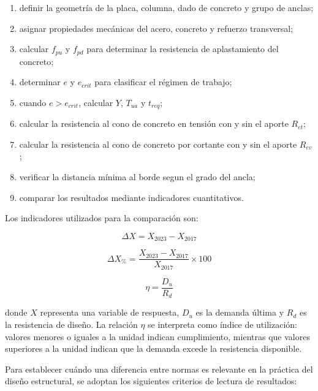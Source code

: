 \begin{enumerate}
  \item definir la geometría de la placa, columna, dado de concreto y grupo de anclas;
  \item asignar propiedades mecánicas del acero, concreto y refuerzo transversal;
  \item calcular $f_{pu}$ y $f_{pd}$ para determinar la resistencia de aplastamiento del concreto;
  \item determinar $e$ y $e_{crit}$ para clasificar el régimen de trabajo;
  \item cuando $e>e_{crit}$, calcular $Y$, $T_{ua}$ y $t_{req}$;
  \item calcular la resistencia al cono de concreto en tensión con y sin el aporte $R_{et}$;
  \item calcular la resistencia al cono de concreto por cortante con y sin el aporte $R_{ev}$;
  \item verificar la distancia mínima al borde segun el grado del ancla;
  \item comparar los resultados mediante indicadores cuantitativos.
\end{enumerate}

Los indicadores utilizados para la comparación son:

\begin{equation}
  \Delta X = X_{2023} - X_{2017}
  \label{eq:met_delta_abs}
\end{equation}

\begin{equation}
  \Delta X_{\%} = \frac{X_{2023}-X_{2017}}{X_{2017}}\times 100
  \label{eq:met_delta_pct}
\end{equation}

\begin{equation}
  \eta = \frac{D_u}{R_d}
  \label{eq:met_eta}
\end{equation}

\noindent donde $X$ representa una variable de respuesta, $D_u$ es la demanda última y $R_d$ es la
resistencia de diseño. La relación $\eta$ se interpreta como índice de utilización: valores menores
o iguales a la unidad indican cumplimiento, mientras que valores superiores a la unidad indican que
la demanda excede la resistencia disponible.

Para establecer cuándo una diferencia entre normas es relevante en la práctica del diseño
estructural, se adoptan los siguientes criterios de lectura de resultados:


